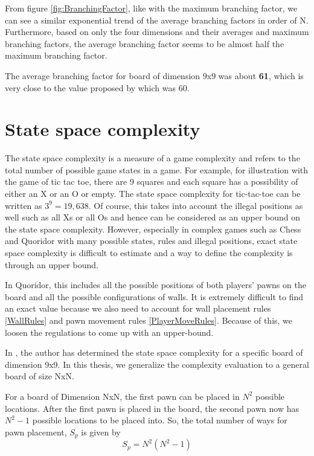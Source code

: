 From figure \ref{fig:BranchingFactor}, like with the maximum branching factor, we can see a similar exponential trend of the average branching factors in order of N. Furthermore, based on only the four dimensions and their averages and maximum branching factors, the average branching factor seems to be almost half the maximum branching factor.

The average branching factor for board of dimension 9x9 was about \textbf{61}, which is very close to the value proposed by \citep{Glendenning2002MasteringQ} which was 60.

\section{State space complexity}

The state space complexity is a measure of a game complexity and refers to the total number of possible game states in a game. For example, for illustration with the game of tic tac toe, there are 9 squares and each square has a possibility of either an X or an O or empty. The state space complexity for tic-tac-toe can be written as $3^9 = 19,638$. Of course, this takes into account the illegal positions as well such as all Xs or all Os and hence can be considered as an upper bound on the state space complexity. However, especially in complex games such as Chess and Quoridor with many possible states, rules and illegal positions, exact state space complexity is difficult to estimate and a way to define the complexity is through an upper bound.  

In Quoridor, this includes all the possible positions of both players' pawns on the board and all the possible configurations of walls. It is extremely difficult to find an exact value because we also need to account for wall placement rules \ref{WallRules} and pawn movement rules \ref{PlayerMoveRules}. Because of this, we loosen the regulations to come up with an upper-bound.

In \citep{Mertens2006Quoridor}, the author has determined the state space complexity for a specific board of dimension 9x9. In this thesis, we generalize the complexity evaluation to a general board of size NxN.

For a board of Dimension NxN, the first pawn can be placed in $N^2$ possible locations. After the first pawn is placed in the board, the second pawn now has $N^2-1$ possible locations to be placed into. So, the total number of ways for pawn placement, $S_p$ is given by
\begin{equation}
    S_p = N^2(N^2 - 1)
\end{equation}

